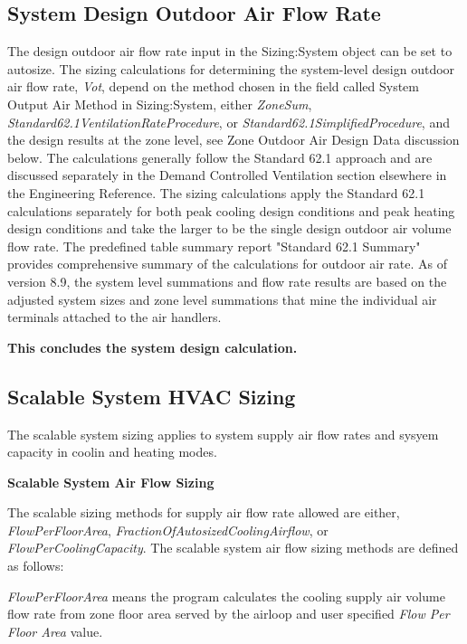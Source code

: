 \subsection{System Design Outdoor Air Flow Rate}\label{Design-Outdoor-Air-Flow-Rate}

The design outdoor air flow rate input in the Sizing:System object can be set to autosize. The sizing calculations for determining the system-level design outdoor air flow rate, \emph{Vot}, depend on the method chosen in the field called System Output Air Method in Sizing:System, either \emph{ZoneSum}, \emph{Standard62.1VentilationRateProcedure}, or \emph{Standard62.1SimplifiedProcedure}, and the design results at the zone level, see Zone Outdoor Air Design Data discussion below. The calculations generally follow the Standard 62.1 approach and are discussed separately in the Demand Controlled Ventilation section elsewhere in the Engineering Reference. The sizing calculations apply the Standard 62.1 calculations separately for both peak cooling design conditions and peak heating design conditions and take the larger to be the single design outdoor air volume flow rate. The predefined table summary report "Standard 62.1 Summary" provides comprehensive summary of the calculations for outdoor air rate.  As of version 8.9, the system level summations and flow rate results are based on the adjusted system sizes and zone level summations that mine the individual air terminals attached to the air handlers.



\textbf{This concludes the system design calculation.}

\subsection{Scalable System HVAC Sizing}\label{scalable-system-HVAC-sizing}

The scalable system sizing applies to system supply air flow rates and sysyem capacity in coolin and heating modes.

\textbf{Scalable System Air Flow Sizing}

The scalable sizing methods for supply air flow rate allowed are either, \emph{FlowPerFloorArea}, \emph{FractionOfAutosizedCoolingAirflow}, or \emph{FlowPerCoolingCapacity}. The scalable system air flow sizing methods are defined as follows:

\emph{FlowPerFloorArea} means the program calculates the cooling supply air volume flow rate from zone floor area served by the airloop and user specified \emph{Flow Per Floor Area} value.

